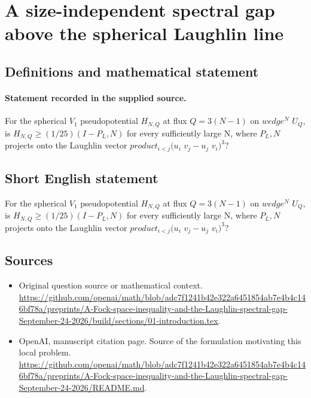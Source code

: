 \documentclass[11pt]{article}
\begin{document}
\section*{A size-independent spectral gap above the spherical Laughlin line}\label{statement}
\subsection{Definitions and mathematical statement}
\paragraph{Statement recorded in the supplied source.}
For the spherical $V_1$ pseudopotential $H_{N,Q}$ at flux $Q=3(N-1)$ on $wedge^N$ $U_Q$, is $H_{N,Q}\geq (1/25)(I-P_L,N)$ for every sufficiently large N, where $P_L,N$ projects onto the Laughlin vector $product_{i<j}(u_i$ $v_j-u_j$ $v_i)^3$?
\subsection{Short English statement}
For the spherical $V_1$ pseudopotential $H_{N,Q}$ at flux $Q=3(N-1)$ on $wedge^N$ $U_Q$, is $H_{N,Q}\geq (1/25)(I-P_L,N)$ for every sufficiently large N, where $P_L,N$ projects onto the Laughlin vector $product_{i<j}(u_i$ $v_j-u_j$ $v_i)^3$?
\subsection{Sources}
\begin{itemize}
\item[S1] Original question source or mathematical context.
\url{https://github.com/openai/math/blob/adc7f1241b42e322a6451854ab7e4b4c146bf78a/preprints/A-Fock-space-inequality-and-the-Laughlin-spectral-gap-September-24-2026/build/sections/01-introduction.tex}.
\item[S2] OpenAI, manuscript citation page. Source of the formulation motivating this local problem.
\url{https://github.com/openai/math/blob/adc7f1241b42e322a6451854ab7e4b4c146bf78a/preprints/A-Fock-space-inequality-and-the-Laughlin-spectral-gap-September-24-2026/README.md}.
\end{itemize}
\end{document}
